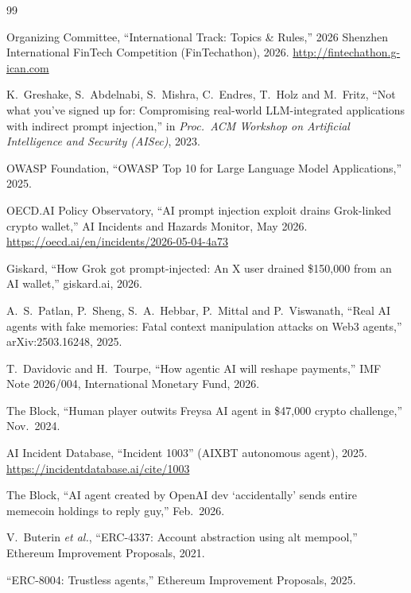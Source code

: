\documentclass[10pt,a4paper,twocolumn]{article}
\begin{document}
\balance
\begin{thebibliography}{99}
\footnotesize
\setlength{\itemsep}{0pt}\setlength{\parskip}{0pt}\setlength{\parsep}{0pt}

 Organizing Committee, ``International Track: Topics \& Rules,'' 2026
Shenzhen International FinTech Competition (FinTechathon), 2026.
\url{http://fintechathon.g-ican.com}

 K.~Greshake, S.~Abdelnabi, S.~Mishra, C.~Endres, T.~Holz and
M.~Fritz, ``Not what you've signed up for: Compromising real-world LLM-integrated
applications with indirect prompt injection,'' in \emph{Proc.\ ACM Workshop on Artificial
Intelligence and Security (AISec)}, 2023.

 OWASP Foundation, ``OWASP Top 10 for Large Language Model
Applications,'' 2025.

 OECD.AI Policy Observatory, ``AI prompt injection exploit drains
Grok-linked crypto wallet,'' AI Incidents and Hazards Monitor, May 2026.
\url{https://oecd.ai/en/incidents/2026-05-04-4a73}

 Giskard, ``How Grok got prompt-injected: An X user drained
\$150,000 from an AI wallet,'' giskard.ai, 2026.

 A.~S.~Patlan, P.~Sheng, S.~A.~Hebbar, P.~Mittal and P.~Viswanath,
``Real AI agents with fake memories: Fatal context manipulation attacks on Web3
agents,'' arXiv:2503.16248, 2025.

 T.~Davidovic and H.~Tourpe, ``How agentic AI will reshape payments,''
IMF Note 2026/004, International Monetary Fund, 2026.

 The Block, ``Human player outwits Freysa AI agent in \$47,000 crypto
challenge,'' Nov.\ 2024.

 AI Incident Database, ``Incident 1003'' (AIXBT autonomous agent), 2025.
\url{https://incidentdatabase.ai/cite/1003}

 The Block, ``AI agent created by OpenAI dev `accidentally' sends
entire memecoin holdings to reply guy,'' Feb.\ 2026.

 V.~Buterin \emph{et al.}, ``ERC-4337: Account abstraction using alt
mempool,'' Ethereum Improvement Proposals, 2021.

 ``ERC-8004: Trustless agents,'' Ethereum Improvement Proposals, 2025.


\end{thebibliography}
\end{document}
